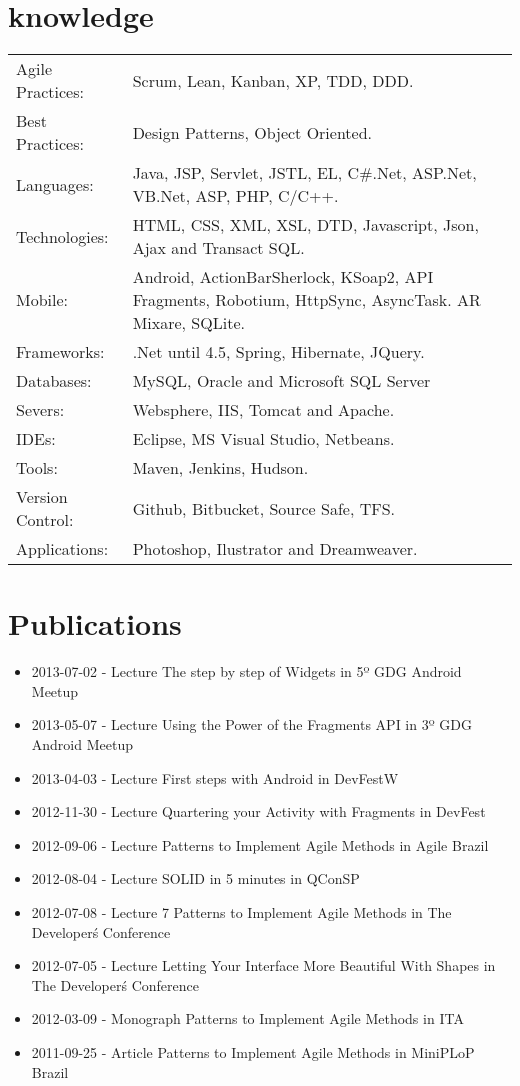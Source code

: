 \documentclass[a4paper, oneside, final]{article}
\begin{document}
\begin{center}
\section{knowledge}

\begin{tabularx}{0.97\linewidth}{p{3.0cm}X}
Agile Practices: & Scrum, Lean, Kanban, XP, TDD, DDD.\\
Best Practices:  & Design Patterns, Object Oriented.\\
Languages:       & Java, JSP, Servlet, JSTL, EL, C\#.Net, ASP.Net, VB.Net, ASP, PHP, C/C++.\\
Technologies:    & HTML, CSS, XML, XSL, DTD, Javascript, Json, Ajax and Transact SQL.\\
Mobile:          & Android, ActionBarSherlock, KSoap2, API Fragments, Robotium, HttpSync, AsyncTask. AR Mixare, SQLite.\\
Frameworks:      & .Net until 4.5, Spring, Hibernate, JQuery.\\
Databases:       & MySQL, Oracle and Microsoft SQL Server \\
Severs:          & Websphere, IIS, Tomcat and Apache.\\
IDEs:            & Eclipse, MS Visual Studio, Netbeans.\\
Tools:			 & Maven, Jenkins, Hudson.\\
Version Control: & Github, Bitbucket, Source Safe, TFS.\\
Applications:    & Photoshop, Ilustrator and Dreamweaver.\\
\end{tabularx}

\section{Publications}
\begin{itemize}
	\item 2013-07-02 - Lecture The step by step of Widgets in 5º GDG Android Meetup
	\item 2013-05-07 - Lecture Using the Power of the Fragments API in 3º GDG Android Meetup
	\item 2013-04-03 - Lecture First steps with Android in DevFestW
	\item 2012-11-30 - Lecture Quartering your Activity with Fragments in DevFest
	\item 2012-09-06 - Lecture Patterns to Implement Agile Methods in Agile Brazil
	\item 2012-08-04 - Lecture SOLID in 5 minutes in QConSP
	\item 2012-07-08 - Lecture 7 Patterns to Implement Agile Methods in The Developer\'s Conference
	\item 2012-07-05 - Lecture Letting Your Interface More Beautiful With Shapes in The Developer\'s Conference
	\item 2012-03-09 - Monograph Patterns to Implement Agile Methods in ITA
	\item 2011-09-25 - Article Patterns to Implement Agile Methods in MiniPLoP Brazil
\end{itemize}


\end{center}
\end{document}
